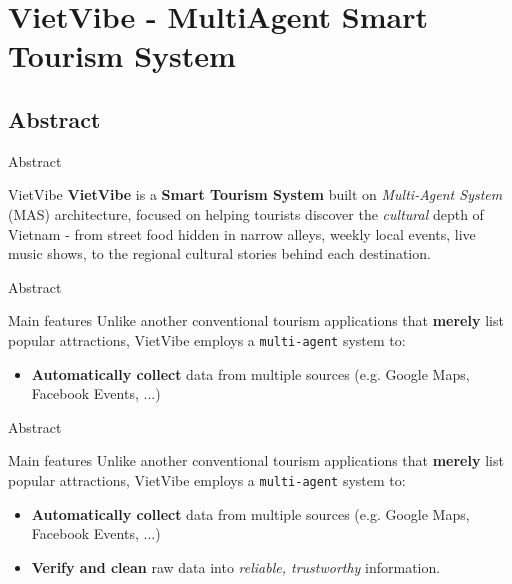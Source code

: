 \section{VietVibe - MultiAgent Smart Tourism System}
\subsection{Abstract}
\begin{frame}{Abstract}
    \begin{block}{VietVibe}
    \textbf{VietVibe} is a \textbf{Smart Tourism System} built on \textit{Multi-Agent System} (MAS) architecture, focused on helping tourists discover the \textit{cultural} depth of Vietnam - from street food hidden in narrow alleys, weekly local events, live music shows, to the regional cultural stories behind each destination.
    \end{block}
\end{frame}

\begin{frame}{Abstract}
    \begin{block}{Main features}
    Unlike another conventional tourism applications that \textbf{merely} list popular attractions, VietVibe employs a \texttt{multi-agent} system to:
    \begin{itemize}
        \item \textbf{Automatically collect} data from multiple sources (e.g. Google Maps, Facebook Events, ...)
    \end{itemize}
    \end{block}
\end{frame}

\begin{frame}{Abstract}
    \begin{block}{Main features}
    Unlike another conventional tourism applications that \textbf{merely} list popular attractions, VietVibe employs a \texttt{multi-agent} system to:
    \begin{itemize}
        \item \textbf{Automatically collect} data from multiple sources (e.g. Google Maps, Facebook Events, ...)
        \item \textbf{Verify and clean} raw data into \textit{reliable, trustworthy} information.
    \end{itemize}
    \end{block}
\end{frame}


